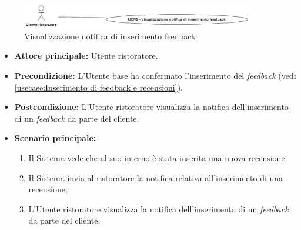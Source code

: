 \newpage
{}
\label{usecase:Visualizzazione notifica di inserimento feedback}

\begin{figure}[h]
	\centering
	\includegraphics[width=0.9\textwidth]{./uml/UCR6.png} 
	\caption{Visualizzazione notifica di inserimento feedback}
	\label{fig:UCR6}
  \end{figure}

\begin{itemize}
	\item \textbf{Attore principale:} Utente ristoratore.

	\item \textbf{Precondizione:} L'Utente base ha confermato l'inserimento del \textit{feedback} (vedi \autoref{usecase:Inserimento di feedback e recensioni}).

	\item \textbf{Postcondizione:} L'Utente ristoratore visualizza la notifica dell'inserimento di un \textit{feedback} da parte del cliente.

	\item \textbf{Scenario principale:}
	      \begin{enumerate}
		      \item Il Sistema vede che al suo interno è stata inserita una nuova recensione;
		      \item Il Sistema invia al ristoratore la notifica relativa all'inserimento di una recensione;
		      \item L'Utente ristoratore visualizza la notifica dell'inserimento di un \textit{feedback} da parte del cliente.
	      \end{enumerate}
\end{itemize}

